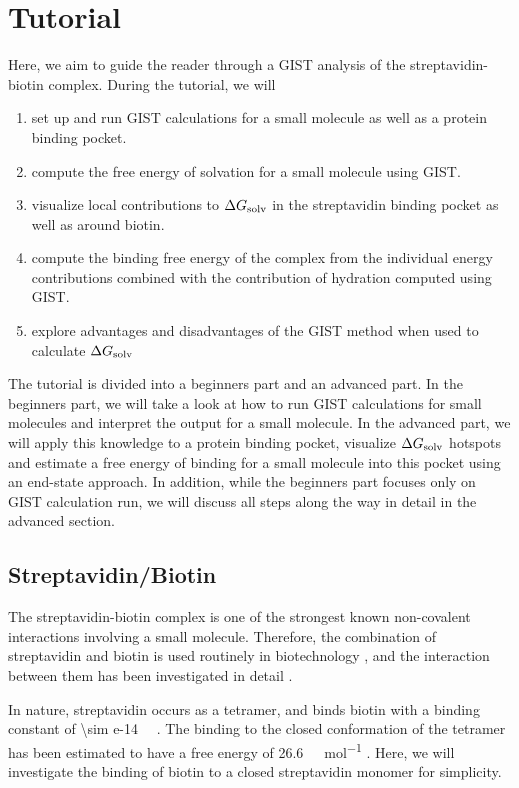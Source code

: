 \documentclass[9pt,tutorial]{livecoms}
\newcommand{\dgsolv}{\Delta G_\textup{solv}}
\begin{document}
\section{Tutorial}
Here, we aim to guide the reader through a GIST analysis of the streptavidin-biotin complex.
During the tutorial, we will
\begin{enumerate}
	\item set up and run GIST calculations for a small molecule as well as a protein binding pocket.
	\item compute the free energy of solvation for a small molecule using GIST.
	\item visualize local contributions to $\dgsolv$ in the streptavidin binding pocket as well as around biotin.
	\item compute the binding free energy of the complex from the individual energy contributions combined with the contribution of hydration computed using GIST.
	\item explore advantages and disadvantages of the GIST method when used to calculate  $\dgsolv$
\end{enumerate}
The tutorial is divided into a beginners part and an advanced part. In the beginners part, we will take a look at how to run GIST calculations for small molecules and interpret the output for a small molecule. In the advanced part, we will apply this knowledge to a protein binding pocket, visualize $\dgsolv$ hotspots and estimate a free energy of binding for a small molecule into this pocket using an end-state approach. In addition, while the beginners part focuses only on GIST calculation run, we will discuss all steps along the way in detail in the advanced section.

\subsection{Streptavidin/Biotin}
The streptavidin-biotin complex is one of the strongest known non-covalent interactions involving a small molecule.
Therefore, the combination of streptavidin and biotin is used routinely in biotechnology \cite{Dundas2013-streptavidin-review}, and the interaction between them has been investigated in detail \cite{McConnell2021-biotin}.

\newcommand{\appr}{{\mathord{\sim}}}
In nature, streptavidin occurs as a tetramer, and binds biotin with a binding constant of \SI{\sim e-14}{\per\Molar} \cite{Dundas2013-streptavidin-review}.
The binding to the closed conformation of the tetramer has been estimated to have a free energy of \SI{26.6}{\kilo\calorie\per\mol} \cite{Bansal2018-biotin}.
Here, we will investigate the binding of biotin to a closed streptavidin monomer for simplicity.
\end{document}
